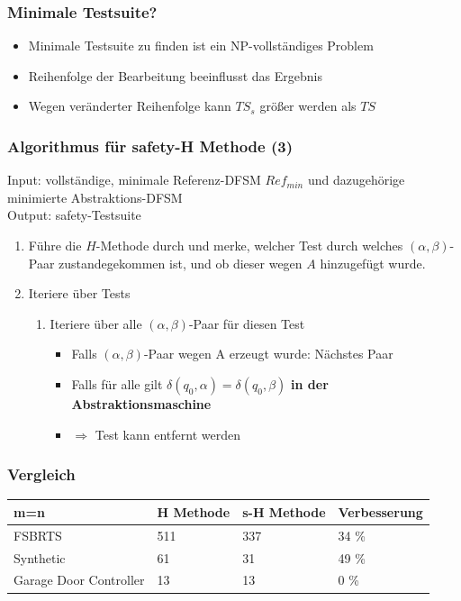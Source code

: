 \documentclass[10pt]{beamer}
\begin{document}
\begin{frame}
\frametitle{Minimale Testsuite?}
\begin{itemize}
  \item Minimale Testsuite zu finden ist ein NP-vollständiges Problem
  \item Reihenfolge der Bearbeitung beeinflusst das Ergebnis
  \item Wegen veränderter Reihenfolge kann $TS_s$ größer werden als $TS$
\end{itemize}
\end{frame}

\begin{frame}
\frametitle{Algorithmus für safety-H Methode (3)}
Input: vollständige, minimale Referenz-DFSM $Ref_{min}$ und dazugehörige minimierte Abstraktions-DFSM\\
Output: safety-Testsuite
\begin{enumerate}
  \item Führe die $H$-Methode durch und merke, welcher Test durch welches $(\alpha,\beta)$-Paar zustandegekommen ist, und ob dieser wegen $A$ hinzugefügt wurde.
  \item Iteriere über Tests
  \begin{enumerate}
    \item Iteriere über alle $(\alpha,\beta)$-Paar für diesen Test\\
    \begin{itemize}
      \item[] Falls $(\alpha,\beta)$-Paar wegen A erzeugt wurde: Nächstes Paar
      \item[] Falls für alle gilt $\delta(q_0,\alpha) = \delta(q_0,\beta)$ \textbf{in der Abstraktionsmaschine}
      \item[] $\Rightarrow$ Test kann entfernt werden

    \end{itemize}
  \end{enumerate}
\end{enumerate}
\end{frame}

\begin{frame}
\frametitle{Vergleich}
\begin{table}[]
\centering
\begin{tabular}{|l|l|l|l|}
\hline
m=n                    & H Methode & s-H Methode & Verbesserung \\\hline
FSBRTS                 & 511       & 337         & 34 \%        \\
Synthetic              & 61        & 31          & 49 \%        \\
Garage Door Controller & 13        & 13          & 0 \%         \\
\hline
\end{tabular}
\end{table}
\end{frame}
\end{document}
